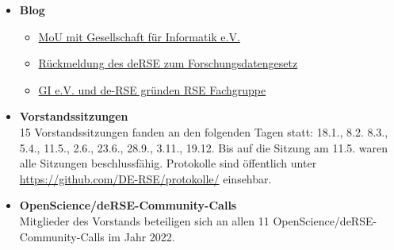 \begin{itemize}
 \item \textbf{Blog}
 \begin{itemize}
  \item \href{https://de-rse.org/blog/2023/02/03/Gesellschaft-fuer-Informatik-und-de-RSE-wollen-enger-zusammenarbeiten.html}{MoU mit Gesellschaft für Informatik e.V.}
  \item \href{https://de-rse.org/blog/2023/04/05/R\%C3\%BCckmeldung-des-deRSE-zum-Forschungsdatengesetz.html}{Rückmeldung des deRSE zum Forschungsdatengesetz}
  \item \href{https://de-rse.org/blog/2023/07/18/RSE-Fachgruppe-de.html}{GI e.V. und de-RSE gründen RSE Fachgruppe}
 \end{itemize}
 \item \textbf{Vorstandssitzungen}\\
  15 Vorstandssitzungen fanden an den folgenden Tagen statt: 18.1., 8.2. 8.3., 5.4., 11.5., 2.6., 23.6., 28.9., 3.11., 19.12.
  Bis auf die Sitzung am 11.5. waren alle Sitzungen beschlussfähig.
  Protokolle sind öffentlich unter \href{https://github.com/DE-RSE/protokolle/}{https://github.com/DE-RSE/protokolle/} einsehbar.
 \item \textbf{OpenScience/deRSE-Community-Calls}\\
 Mitglieder des Vorstands beteiligen sich an allen 11 OpenScience/deRSE-Community-Calls im Jahr 2022.
\end{itemize}




